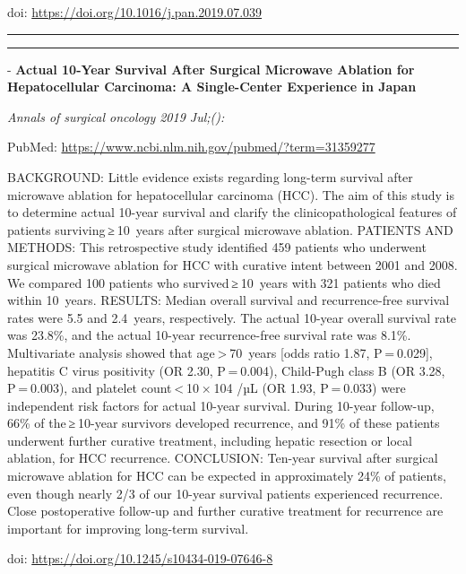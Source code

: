 \documentclass[]{article}
\begin{document}
doi: \url{https://doi.org/10.1016/j.pan.2019.07.039}

{}

{}

\begin{center}\rule{0.5\linewidth}{\linethickness}\end{center}

\begin{center}\rule{0.5\linewidth}{\linethickness}\end{center}

 - \textbf{Actual 10-Year Survival After Surgical Microwave Ablation for
Hepatocellular Carcinoma: A Single-Center Experience in Japan}

\emph{Annals of surgical oncology 2019 Jul;():}

PubMed: \url{https://www.ncbi.nlm.nih.gov/pubmed/?term=31359277}

BACKGROUND: Little evidence exists regarding long-term survival after
microwave ablation for hepatocellular carcinoma (HCC). The aim of this
study is to determine actual 10-year survival and clarify the
clinicopathological features of patients surviving ≥ 10~years after
surgical microwave ablation. PATIENTS AND METHODS: This retrospective
study identified 459 patients who underwent surgical microwave ablation
for HCC with curative intent between 2001 and 2008. We compared 100
patients who survived ≥ 10~years with 321 patients who died within
10~years. RESULTS: Median overall survival and recurrence-free survival
rates were 5.5 and 2.4~years, respectively. The actual 10-year overall
survival rate was 23.8\%, and the actual 10-year recurrence-free
survival rate was 8.1\%. Multivariate analysis showed that
age \textgreater{} 70~years {[}odds ratio 1.87, P = 0.029{]}, hepatitis
C virus positivity (OR 2.30, P = 0.004), Child-Pugh class B (OR 3.28,
P = 0.003), and platelet count \textless{} 10 × 104 /µL (OR 1.93,
P = 0.033) were independent risk factors for actual 10-year survival.
During 10-year follow-up, 66\% of the ≥ 10-year survivors developed
recurrence, and 91\% of these patients underwent further curative
treatment, including hepatic resection or local ablation, for HCC
recurrence. CONCLUSION: Ten-year survival after surgical microwave
ablation for HCC can be expected in approximately 24\% of patients, even
though nearly 2/3 of our 10-year survival patients experienced
recurrence. Close postoperative follow-up and further curative treatment
for recurrence are important for improving long-term survival.

doi: \url{https://doi.org/10.1245/s10434-019-07646-8}
\end{document}
